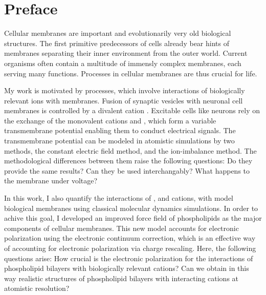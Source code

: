 \chapter*{Preface}

Cellular membranes are important and evolutionarily very old biological structures. 
\citep{MolBiolCell} 
The first primitive predecessors of cells already bear hints of membranes 
separating their inner environment from the outer world. 
Current organisms often contain a multitude of immensly complex membranes, 
each serving many functions. 
Processes in cellular membranes are thus crucial for life. 

My work is motivated by processes,
which involve interactions of biologically relevant ions with membranes. 
Fusion of synaptic vesicles with neuronal cell membranes 
is controlled by a divalent cation .
Excitable cells like neurons 
rely on the exchange of the monovalent cations  and ,
which form a variable transmembrane potential
enabling them to conduct electrical signals. 
The transmembrane potential can be modeled in atomistic simulations by two methods, 
the constant electric field method, 
and the ion-imbalance method. 
The methodological differences between them raise the following questions:
Do they provide the same results? 
Can they be used interchangably?
What happens to the membrane under voltage?


In this work, 
I also quantify the interactions of 
,  and  cations,
with model biological membranes
using classical molecular dynamics simulations. 
In order to achive this goal,
I developed an improved force field
of phospholipids as the major components of cellular membranes.
This new model accounts for electronic polarization
using the electronic continuum correction,  
which is an effective way of accounting for electronic polarization via charge rescaling. 
Here, the following questions arise:
How crucial is the electronic polarization for the interactions of phospholipid bilayers with biologically relevant cations?
Can we obtain in this way realistic structures of phospholipid bilayers with interacting cations at atomistic resolution?



